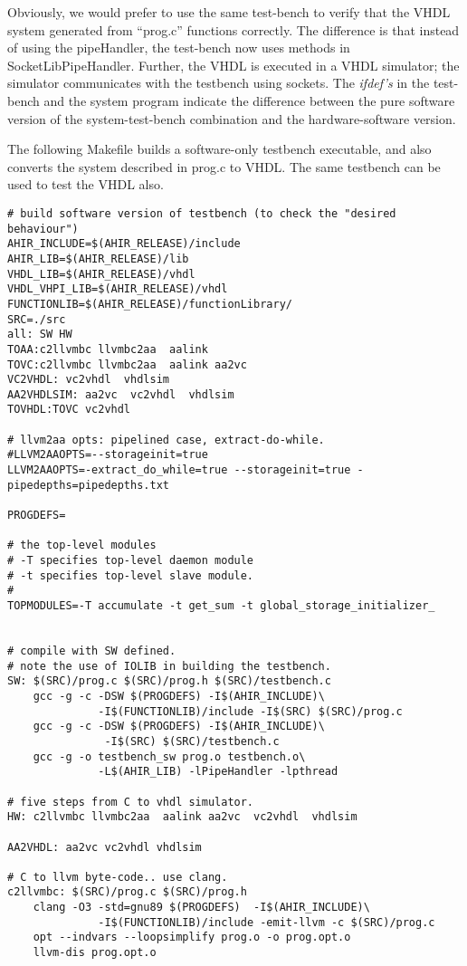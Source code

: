 \documentclass{article}
\begin{document}
Obviously, we would prefer to use the same test-bench
to verify that the VHDL system generated from ``prog.c'' 
functions correctly.  
The difference is that instead of using the pipeHandler,
the test-bench now uses methods in SocketLibPipeHandler.  Further, the
VHDL is executed in a VHDL simulator; the simulator communicates
with the testbench using sockets.
The {\em ifdef's} in the test-bench and the system program
indicate the difference between the pure software version
of the system-test-bench combination and the hardware-software
version.  

The following Makefile builds a software-only testbench
executable, and also converts the system described in prog.c
to VHDL.  The same testbench can be used to test the VHDL
also.
\begin{verbatim}
# build software version of testbench (to check the "desired behaviour")
AHIR_INCLUDE=$(AHIR_RELEASE)/include
AHIR_LIB=$(AHIR_RELEASE)/lib
VHDL_LIB=$(AHIR_RELEASE)/vhdl
VHDL_VHPI_LIB=$(AHIR_RELEASE)/vhdl
FUNCTIONLIB=$(AHIR_RELEASE)/functionLibrary/
SRC=./src
all: SW HW 
TOAA:c2llvmbc llvmbc2aa  aalink
TOVC:c2llvmbc llvmbc2aa  aalink aa2vc 
VC2VHDL: vc2vhdl  vhdlsim
AA2VHDLSIM: aa2vc  vc2vhdl  vhdlsim
TOVHDL:TOVC vc2vhdl

# llvm2aa opts: pipelined case, extract-do-while.
#LLVM2AAOPTS=--storageinit=true
LLVM2AAOPTS=-extract_do_while=true --storageinit=true -pipedepths=pipedepths.txt

PROGDEFS=

# the top-level modules
# -T specifies top-level daemon module
# -t specifies top-level slave module.
#
TOPMODULES=-T accumulate -t get_sum -t global_storage_initializer_


# compile with SW defined.
# note the use of IOLIB in building the testbench.
SW: $(SRC)/prog.c $(SRC)/prog.h $(SRC)/testbench.c 
	gcc -g -c -DSW $(PROGDEFS) -I$(AHIR_INCLUDE)\
              -I$(FUNCTIONLIB)/include -I$(SRC) $(SRC)/prog.c
	gcc -g -c -DSW $(PROGDEFS) -I$(AHIR_INCLUDE)\
               -I$(SRC) $(SRC)/testbench.c
	gcc -g -o testbench_sw prog.o testbench.o\
              -L$(AHIR_LIB) -lPipeHandler -lpthread

# five steps from C to vhdl simulator.
HW: c2llvmbc llvmbc2aa  aalink aa2vc  vc2vhdl  vhdlsim

AA2VHDL: aa2vc vc2vhdl vhdlsim

# C to llvm byte-code.. use clang.
c2llvmbc: $(SRC)/prog.c $(SRC)/prog.h
	clang -O3 -std=gnu89 $(PROGDEFS)  -I$(AHIR_INCLUDE)\
              -I$(FUNCTIONLIB)/include -emit-llvm -c $(SRC)/prog.c
	opt --indvars --loopsimplify prog.o -o prog.opt.o
	llvm-dis prog.opt.o


\end{verbatim}
\end{document}
